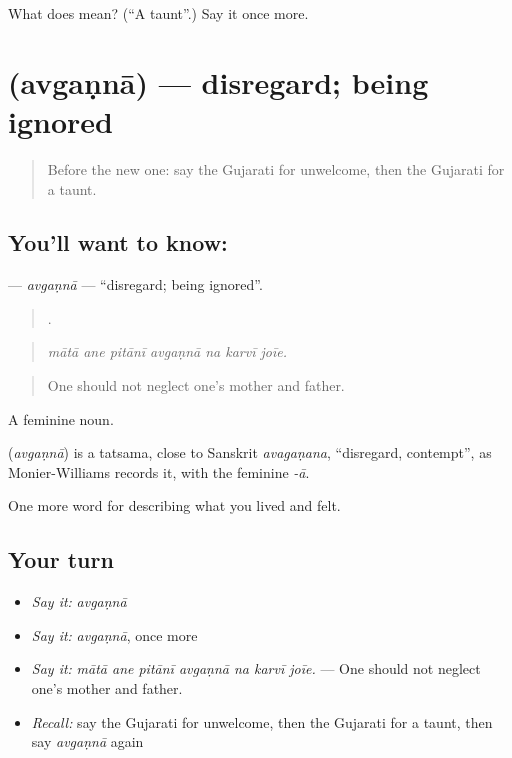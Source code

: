 \begin{tcolorbox}[breakable,colback=teal!4,colframe=teal!35!black,title={Before you move on}]
What does  mean? (\textquotedblleft{}A taunt\textquotedblright{}.) Say it once more.
\end{tcolorbox}
\section[\texorpdfstring{\gu{અવગણના} (avgaṇnā)}{અવગણના (avgaṇnā)}]{ (avgaṇnā) — disregard; being ignored}

\label{lesson:GU-C456-avganna}



\begin{quote}
Before the new one: say the Gujarati for unwelcome, then the Gujarati for a taunt.
\end{quote}

\subsection*{You'll want to know: }
\textbf{} — \emph{avgaṇnā} — \textquotedblleft{}disregard; being ignored\textquotedblright{}.

\begin{quote}
      .
\end{quote}

\begin{quote}
\emph{mātā ane pitānī avgaṇnā na karvī joīe.}
\end{quote}

\begin{quote}
One should not neglect one's mother and father.
\end{quote}

A feminine noun.

\begin{cousinweb}
\textbf{} (\emph{avgaṇnā}) is a tatsama, close to Sanskrit \emph{avagaṇana}, \textquotedblleft{}disregard, contempt\textquotedblright{}, as Monier-Williams records it, with the feminine \emph{-ā}.
\end{cousinweb}

\begin{grammarlens}[title={What you've built}]
One more word for describing what you lived and felt.
\end{grammarlens}

\subsection*{Your turn}
\begin{itemize}
\raggedright
  \item \emph{Say it:} \emph{avgaṇnā}
  \item \emph{Say it:} \emph{avgaṇnā}, once more
  \item \emph{Say it:} \emph{mātā ane pitānī avgaṇnā na karvī joīe.} — One should not neglect one's mother and father.
  \item \emph{Recall:} say the Gujarati for unwelcome, then the Gujarati for a taunt, then say \emph{avgaṇnā} again
\end{itemize}

